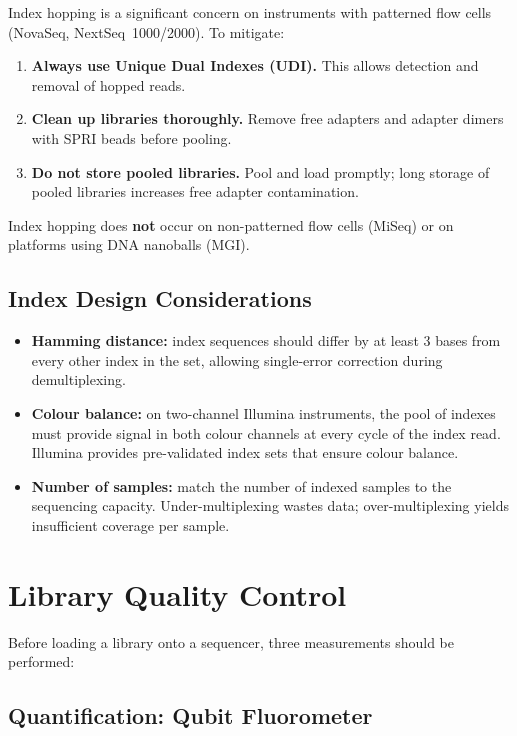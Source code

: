 \begin{warningbox}[title={Index Hopping on Patterned Flow Cells}]
Index hopping is a significant concern on instruments with patterned flow cells (NovaSeq, NextSeq~1000/2000). To mitigate:
\begin{enumerate}[nosep]
  \item \textbf{Always use Unique Dual Indexes (UDI).} This allows detection and removal of hopped reads.
  \item \textbf{Clean up libraries thoroughly.} Remove free adapters and adapter dimers with SPRI beads before pooling.
  \item \textbf{Do not store pooled libraries.} Pool and load promptly; long storage of pooled libraries increases free adapter contamination.
\end{enumerate}
Index hopping does \textbf{not} occur on non-patterned flow cells (MiSeq) or on platforms using DNA nanoballs (MGI).
\end{warningbox}

\subsection{Index Design Considerations}

\begin{itemize}[nosep]
  \item \textbf{Hamming distance:} index sequences should differ by at least 3 bases from every other index in the set, allowing single-error correction during demultiplexing.
  \item \textbf{Colour balance:} on two-channel Illumina instruments, the pool of indexes must provide signal in both colour channels at every cycle of the index read. Illumina provides pre-validated index sets that ensure colour balance.
  \item \textbf{Number of samples:} match the number of indexed samples to the sequencing capacity. Under-multiplexing wastes data; over-multiplexing yields insufficient coverage per sample.
\end{itemize}


\section{Library Quality Control}
\label{sec:library_qc}

Before loading a library onto a sequencer, three measurements should be performed:

\subsection{Quantification: Qubit Fluorometer}

